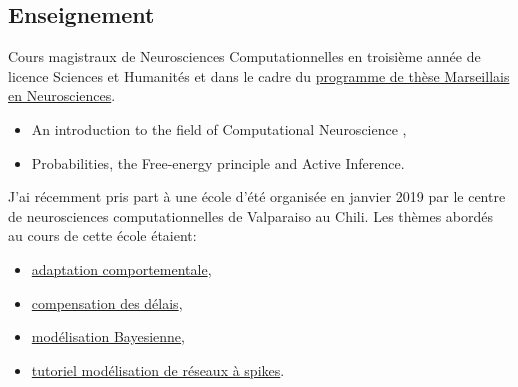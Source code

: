 \documentclass[10pt,french,a4paper,twoside]{article}%
\newcommand{\years}[1]{\marginpar{\textit{\scriptsize #1}}}
\begin{document}
\subsection{Enseignement} %

Cours magistraux de Neurosciences Computationnelles en  troisième année de licence Sciences et Humanités\years{2019} et dans le cadre du  \href{https://laurentperrinet.github.io/post/2018-03-26-cours-neuro-comp-fep/}{programme de thèse Marseillais en Neurosciences}\years{2018}.

\begin{itemize}
	\item An introduction to the field of Computational Neuroscience ,
	\item Probabilities, the Free-energy principle and Active Inference.
\end{itemize}


J'ai récemment pris part à une école d'été organisée en janvier 2019 par le centre de neurosciences computationnelles de Valparaiso au Chili. Les thèmes abordés au cours de cette école étaient:
\begin{itemize}
	\item \href{https://laurentperrinet.github.io/talk/2019-01-18-laconeu/}{adaptation comportementale},
	\item \href{https://laurentperrinet.github.io/talk/2019-01-17-laconeu/}{compensation des délais},
	\item \href{https://laurentperrinet.github.io/talk/2019-01-16-laconeu/}{modélisation Bayesienne},
	\item \href{https://laurentperrinet.github.io/talk/2019-01-14-laconeu/}{tutoriel modélisation de réseaux à spikes}.

\end{itemize}

%
%
%
%
%
\end{document}
